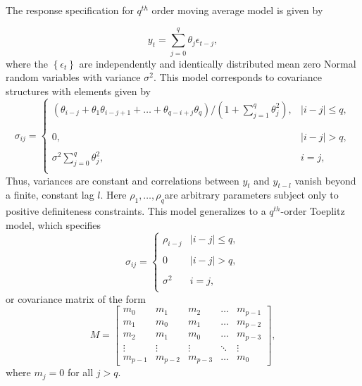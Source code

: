 \bigskip

The response specification for $q^{th}$ order moving average model  is given by 

\begin{equation}\label{eq:ma-q-model}
y_{t} = \sum_{j = 0}^{q} \theta_j \epsilon_{t-j},
\end{equation}
\bigskip
\noindent
where the $\left\{\epsilon_t\right\}$ are independently and identically distributed mean zero Normal random variables with variance $\sigma^2$. This model corresponds to covariance structures with elements given by
\begin{equation*}
\sigma_{ij} = \left\{ \begin{array}{ll}
\left(\theta_{i-j} + \theta_{1}\theta_{i-j +1} + \dots + \theta_{q-i+j}\theta_{q}\right)/\left(1 + \sum_{j = 1}^q \theta_j^2\right), & \vert i-j\vert \le q,\\ 
& \\
& \\
0, &  \vert i-j\vert > q, \\
& \\
\sigma^2 \sum\limits_{j = 0}^q \theta_j^2, & i = j,\\
\end{array}\right.
\end{equation*}
\bigskip
\noindent
Thus, variances are constant and correlations between $y_t$ and $y_{t-l}$ vanish beyond a finite, constant lag $l$. Here $\rho_1,\dots, \rho_q$are arbitrary parameters subject only to positive definiteness constraints. This model generalizes to a $q^{th}$-order Toeplitz model, which specifies
\begin{equation} \label{eq:toeplitz-covariance-model}
\sigma_{ij} = \left\{ \begin{array}{ll}
\rho_{i-j} & \vert i - j \vert\le q, \\ 
&\\
0 & \vert i - j \vert >  q, \\ 
& \\
\sigma^2  & i = j,\\
\end{array}\right.
\end{equation}
or covariance matrix of the form
\begin{equation} \label{eq:toeplitz-covariance-matrix}
M = \begin{bmatrix} m_0 & m_1 & m_2 & \dots & m_{p-1}\\ m_1 & m_0 & m_1 & \dots & m_{p-2}\\m_2 & m_1 & m_0 & \dots & m_{p-3}\\ \vdots & \vdots & \vdots & \ddots & \vdots\\  m_{p-1} & m_{p-2} & m_{p-3} & \dots & m_0 \end{bmatrix}, 
\end{equation}
\noindent
where $m_j = 0$ for all $j > q$.


